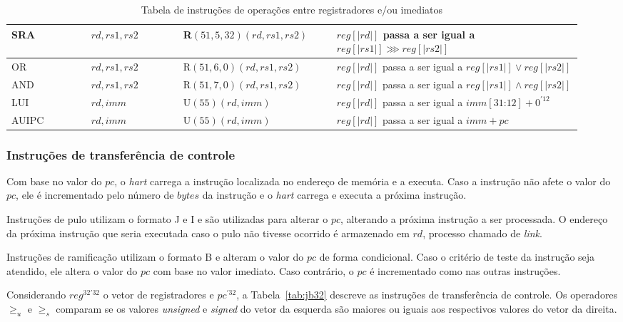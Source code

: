 \begin{table}
\begin{tabular}{ |p{0.13\linewidth}||p{0.15\linewidth}|p{0.25\linewidth}|p{0.40\linewidth}| }
SRA & $rd, rs1, rs2$ & R$(51, 5, 32)(rd, rs1, rs2)$ & $reg[|rd|]$ passa a ser igual a ${reg[|rs1|] \ggg reg[|rs2|]}$ \\ \hline
OR & $rd, rs1, rs2$ & R$(51, 6, 0)(rd, rs1, rs2)$ & $reg[|rd|]$ passa a ser igual a ${reg[|rs1|] \lor reg[|rs2|]}$ \\ \hline
AND & $rd, rs1, rs2$ & R$(51, 7, 0)(rd, rs1, rs2)$ & $reg[|rd|]$ passa a ser igual a ${reg[|rs1|] \land reg[|rs2|]}$ \\ \hline
LUI & $rd, imm$ & U$(55)(rd, imm)$ & $reg[|rd|]$ passa a ser igual a ${imm[31\text{:}12] + 0^{'12}}$ \\ \hline
AUIPC & $rd, imm$ & U$(55)(rd, imm)$ & $reg[|rd|]$ passa a ser igual a ${imm + pc}$ \\ \hline

    \end{tabular}
  \caption{Tabela de instruções de operações entre registradores e/ou imediatos \label{tab:op32}}
  \end{table}

\subsubsection{Instruções de transferência de controle}
\label{ssec:jmp}

  Com base no valor do $pc$, o \emph{hart} carrega a instrução localizada no endereço de memória
  e a executa. Caso a instrução não afete o valor do $pc$, ele é incrementado pelo número
  de $bytes$ da instrução e o \emph{hart} carrega e executa a próxima instrução.

  Instruções de pulo utilizam o formato J e I e são utilizadas para alterar o $pc$, 
  alterando a próxima instrução a ser processada. O endereço da próxima instrução que
  seria executada caso o pulo não tivesse ocorrido é armazenado em $rd$, processo chamado de \emph{link}.

  Instruções de ramificação utilizam o formato B e alteram o valor do $pc$ de forma condicional. Caso o critério de teste
  da instrução seja atendido, ele altera o valor do $pc$ com base no valor imediato. Caso contrário,
  o $pc$ é incrementado como nas outras instruções.

  Considerando $reg^{32'32}$ o vetor de registradores e $pc^{'32}$, a
  Tabela~\ref{tab:jb32} descreve as instruções de transferência de controle.
  Os operadores $\geq_u$ e $\geq_s$ comparam se os valores \emph{unsigned} e \emph{signed} do vetor da 
  esquerda são maiores ou iguais aos respectivos valores do vetor da direita.

